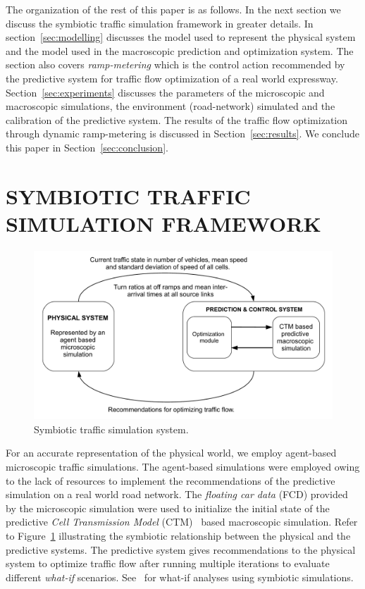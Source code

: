 \documentclass{wscpaperproc}
\theoremstyle{wsc}
\begin{document}
The organization of the rest of this paper is as follows. In the next section we discuss the symbiotic traffic simulation framework in greater details. In section~\ref{sec:modelling} discusses the model used to represent the physical system and the model used in the macroscopic prediction and optimization system. The section also covers {\it ramp-metering} which is the control action recommended by the predictive system for traffic flow optimization of a real world expressway. Section~\ref{sec:experiments} discusses the parameters of the microscopic and macroscopic simulations, the environment (road-network) simulated and the calibration of the predictive system. The results of the traffic flow optimization through dynamic ramp-metering is discussed in Section~\ref{sec:results}. We conclude this paper in Section~\ref{sec:conclusion}.



\section{SYMBIOTIC TRAFFIC SIMULATION FRAMEWORK}
\label{sec:methodology}
\begin{figure}[!htbp]
    \centering
    \includegraphics[scale=0.50]{images/methodology.pdf}

    \caption{Symbiotic traffic simulation system.}
    \label{fig:sts-platform}
  \end{figure}

For an accurate representation of the physical world, we employ agent-based microscopic traffic simulations. The agent-based simulations were employed owing to the lack of resources to implement the recommendations of the predictive simulation on a real world road network. The {\it floating car data} (FCD) provided by the microscopic simulation were used to initialize the initial state of the predictive {\it Cell Transmission Model} (CTM)~\cite{daganzo1994cell} based macroscopic simulation. Refer to Figure~\ref{fig:sts-platform} illustrating the symbiotic relationship between the physical and the predictive systems. The predictive system gives  recommendations to the physical system  to optimize traffic flow after running multiple iterations to evaluate different {\it what-if} scenarios. See~ for what-if analyses using symbiotic simulations.
\end{document}
